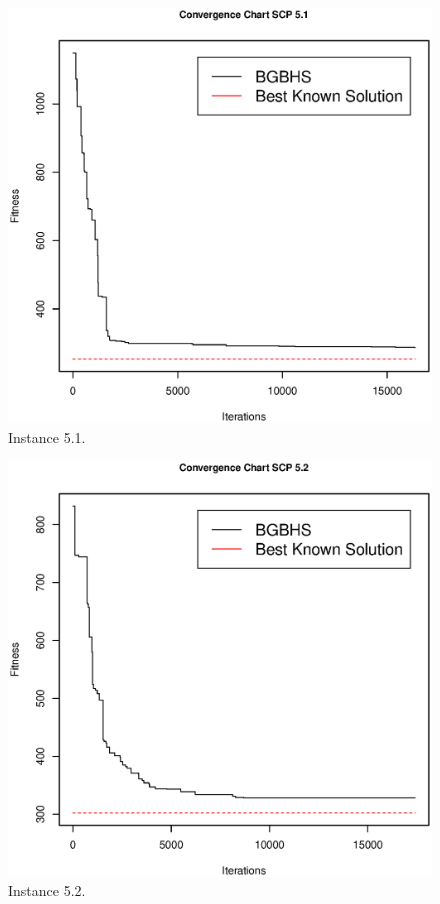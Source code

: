 \begin{figure}[]
\centering
\includegraphics[scale=.45]{Resultados/scp51.eps}
\caption{Instance 5.1.}
\label{fig:Instance.5.1}
\end{figure}

\begin{figure}[]
\centering
\includegraphics[scale=.45]{Resultados/scp52.eps}
\caption{Instance 5.2.}
\label{fig:Instance.5.2}
\end{figure}

